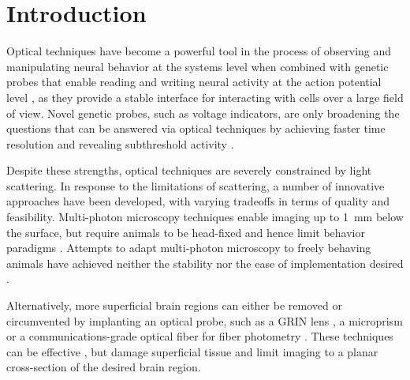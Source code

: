 \chapter{Introduction}
\label{chapter:intro}

\thispagestyle{myheadings}


Optical techniques have become a powerful tool in 
the process of observing and manipulating 
neural behavior at the systems level when combined 
with genetic probes that enable reading and writing 
neural activity at the action potential level 
\cite{Emiliani:2015jl}, as they provide a stable 
interface for interacting with cells over a large 
field of view. Novel genetic probes, such as voltage 
indicators, are only broadening the questions that can 
be answered via optical techniques by achieving 
faster time resolution and revealing subthreshold 
activity \cite{Gong:2015is}.

Despite these strengths, optical techniques are severely 
constrained by light scattering. In response to the 
limitations of scattering, a number of innovative approaches 
have been developed, with varying tradeoffs in terms of quality 
and feasibility. Multi-photon microscopy techniques enable 
imaging up to 1~mm below the surface, but require animals to 
be head-fixed and hence limit behavior paradigms 
\cite{Horton:2013gxa}. Attempts to adapt multi-photon microscopy 
to freely behaving animals have achieved neither the 
stability nor the ease of implementation desired 
\cite{Helmchen:2001tw,Flusberg:2005tq}.

Alternatively, more superficial brain regions can either 
be removed \cite{Dombeck:2010jr} or circumvented 
by implanting an optical probe, such as a GRIN lens 
\cite{Barretto:2009hk}, a microprism \cite{Andermann:2013kc}
or a communications-grade optical fiber for fiber 
photometry \cite{Guo:2015gu}. These techniques can be 
effective \cite{Betley:2015cn}, but damage superficial 
tissue and limit imaging to a planar cross-section 
of the desired brain region. 

